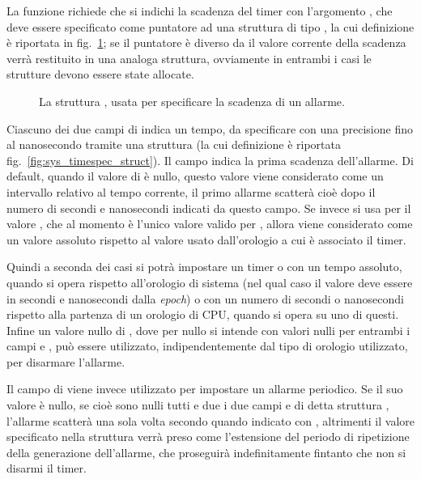 La funzione richiede che si indichi la scadenza del timer con
l'argomento , che deve essere specificato come puntatore ad
una struttura di tipo , la cui definizione è riportata in
fig.~\ref{fig:struct_itimerspec}; se il puntatore  è diverso
da  il valore corrente della scadenza verrà restituito in una
analoga struttura, ovviamente in entrambi i casi le strutture devono essere
state allocate.

\begin{figure}[!htb]
  \footnotesize \centering
  \begin{minipage}[c]{0.8\textwidth}
  \end{minipage} 
  \normalsize 
  \caption{La struttura , usata per specificare la
    scadenza di un allarme.}
  \label{fig:struct_itimerspec}
\end{figure}

Ciascuno dei due campi di  indica un tempo, da specificare
con una precisione fino al nanosecondo tramite una struttura 
(la cui definizione è riportata fig.~\ref{fig:sys_timespec_struct}). Il campo
 indica la prima scadenza dell'allarme. Di default, quando il
valore di  è nullo, questo valore viene considerato come un
intervallo relativo al tempo corrente, il primo allarme scatterà cioè dopo il
numero di secondi e nanosecondi indicati da questo campo. Se invece si usa
per  il valore , che al momento è l'unico
valore valido per , allora  viene considerato come
un valore assoluto rispetto al valore usato dall'orologio a cui è associato il
timer. 

Quindi a seconda dei casi si potrà impostare un timer o con un tempo assoluto,
quando si opera rispetto all'orologio di sistema (nel qual caso il valore deve
essere in secondi e nanosecondi dalla \textit{epoch}) o con un numero di
secondi o nanosecondi rispetto alla partenza di un orologio di CPU, quando si
opera su uno di questi.  Infine un valore nullo di , dove per
nullo si intende con valori nulli per entrambi i campi  e
, può essere utilizzato, indipendentemente dal tipo di orologio
utilizzato, per disarmare l'allarme.

Il campo  di  viene invece utilizzato per
impostare un allarme periodico.  Se il suo valore è nullo, se cioè sono nulli
tutti e due i due campi  e  di detta struttura
, l'allarme scatterà una sola volta secondo quando indicato
con , altrimenti il valore specificato nella struttura verrà
preso come l'estensione del periodo di ripetizione della generazione
dell'allarme, che proseguirà indefinitamente fintanto che non si disarmi il
timer.


